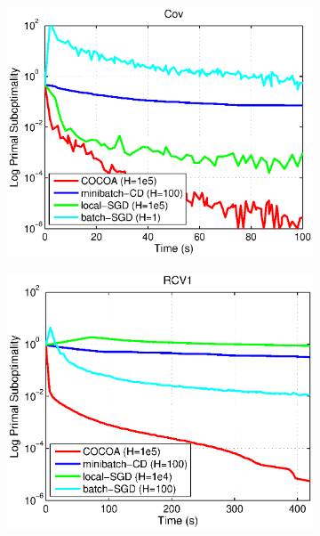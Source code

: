 \documentclass{article} %
\begin{document}
\begin{figure}[H]
\begin{subfigure}{.33\textwidth}
\includegraphics[width=\linewidth]{figs/New_Cov_Best_Batches_Annotated.eps}
\end{subfigure}
\begin{subfigure}{.33\textwidth}
\includegraphics[width=\linewidth]{figs/New_RCV_Best_Batches_Annotated.eps}
\end{subfigure}
\begin{subfigure}{.33\textwidth}

\end{subfigure}
\end{figure}
\end{document}
